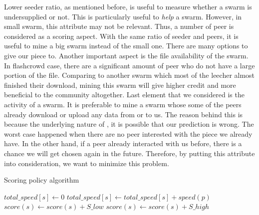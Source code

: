 Lower seeder ratio, as mentioned before, is useful to measure whether a swarm is undersupplied or not. This is particularly useful to \textit{help} a swarm. However, in small swarm, this attribute may not be relevant. Thus, a number of peer is considered as a scoring aspect. With the same ratio of seeder and peers, it is useful to mine a big swarm instead of the small one. There are many options to give our piece to. Another important aspect is the file availability of the swarm. In flashcrowd case, there are a significant amount of peer who do not have a large portion of the file. Comparing to another swarm which most of the leecher almost finished their download, mining this swarm will give higher credit and more beneficial to the community altogether. Last element that we considered is the activity of a swarm. It is preferable to mine a swarm whose some of the peers already download or upload any data from or to us. The reason behind this is because the underlying nature of \bt, it is possible that our prediction is wrong. The worst case happened when there are no peer interested with the piece we already have. In the other hand, if a peer already interacted with us before, there is a chance we will get chosen again in the future. Therefore, by putting this attribute into consideration, we want to minimize this problem.

\begin{algorithm}[h]
	\caption{Scoring policy algorithm}
	\label{alg:scorep}
	\begin{algorithmic}[1]
		\Statex
		\Statex
						\State $total\_speed[s] \gets 0$
				\State $total\_speed[s] \gets total\_speed[s] + speed(p)$
			\EndFor
		\EndFor
		\State {}
				\State $score(s) \gets score(s) + S\_low$
			\Else{\null}
				\State $score(s) \gets score(s) + S\_high$
			\EndIf
		\EndFor
		\State {}
	\end{algorithmic}
\end{algorithm}

